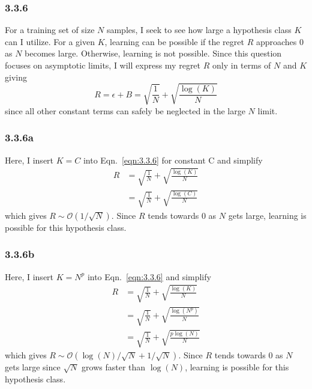 \documentclass[12pt]{amsart}
\begin{document}
\subsubsection*{3.3.6}

For a training set of size $N$ samples, I seek to see how large a hypothesis class $K$ can I utilize.  For a given $K$, learning can be possible if the regret $R$ approaches 0 as $N$ becomes large.  Otherwise, learning is not possible.  Since this question focuses on asymptotic limits, I will express my regret $R$ only in terms of $N$ and $K$ giving
\begin{equation} \label{eqn:3.3.6}
R = \epsilon + B = \sqrt{\frac{1}{N}} + \sqrt{\frac{\log(K)}{N}}
\end{equation}
since all other constant terms can safely be neglected in the large $N$ limit.

\subsubsection*{3.3.6a}

Here, I insert $K = C$ into Eqn.~\ref{eqn:3.3.6} for constant C and simplify
\begin{equation}
\begin{split}
R & = \sqrt{\frac{1}{N}} + \sqrt{\frac{\log(K)}{N}} \\
& = \sqrt{\frac{1}{N}} + \sqrt{\frac{\log(C)}{N}}
\end{split}
\end{equation}
which gives $R {\sim} \mathcal{O}(1/\sqrt{N})$.  Since $R$ tends towards 0 as $N$ gets large, learning is possible for this hypothesis class.

\subsubsection*{3.3.6b}

Here, I insert $K = N^p$ into Eqn.~\ref{eqn:3.3.6} and simplify
\begin{equation}
\begin{split}
R & = \sqrt{\frac{1}{N}} + \sqrt{\frac{\log(K)}{N}} \\
& = \sqrt{\frac{1}{N}} + \sqrt{\frac{\log(N^p)}{N}} \\
& = \sqrt{\frac{1}{N}} + \sqrt{\frac{p\log(N)}{N}}
\end{split}
\end{equation}
which gives $R {\sim} \mathcal{O}(\log(N)/\sqrt{N} + 1/\sqrt{N})$.  Since $R$ tends towards 0 as $N$ gets large since $\sqrt{N}$ grows faster than $\log(N)$, learning is possible for this hypothesis class.
\end{document}
